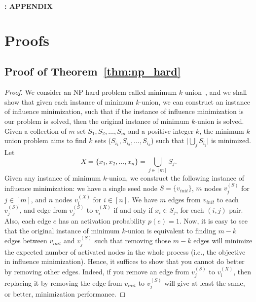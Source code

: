 \newcommand{\smallsection}[1]{\noindent\underline{\smash{\textbf{#1:}}}}

\clearpage
\appendix
\vspace{1mm}
\begin{center}
    \Large{\bf \method: APPENDIX} \\
    \vspace{-1mm}
\end{center}

\section{Proofs}\label{sec:pfs_A}
\subsection{Proof of Theorem~\ref{thm:np_hard}}\label{app:proof:np_hard}
\begin{proof}
    We consider an NP-hard problem called minimum $k$-union~\citep{vinterbo2002note}, and
    we shall show that given each instance of minimum $k$-union, we can construct an instance of influence minimization, such that if the instance of influence minimization is our problem is solved, then the original instance of minimum $k$-union is solved.
    Given a collection of $m$ set $S_1, S_2, \ldots, S_m$ and a positive integer $k$, the minimum $k$-union problem aims to find $k$ sets ($S_{i_1}, S_{i_2}, \ldots, S_{i_k}$) such that $\vert \bigcup_{j} S_{i_j} \vert$ is minimized.
    Let 
    \[X = \{x_1, x_2, \ldots, x_n\} = \bigcup_{j \in [m]}S_j.\]
    Given any instance of minimum $k$-union, we construct the following instance of influence minimization:
    we have a single seed node $S = \{v_{init}\}$,
    $m$ nodes $v^{(S)}_{j}$ for $j \in [m]$, and
    $n$ nodes $v^{(X)}_{i}$ for $i \in [n]$.
    We have $m$ edges from $v_{init}$ to each $v^{(S)}_{j}$, 
    and edge from $v^{(S)}_{j}$ to $v^{(X)}_{i}$ if and only if $x_i \in S_j$, for each $(i, j)$ pair.
    Also, each edge $e$ has an activation probability $p(e) = 1$.
    Now, it is easy to see that the original instance of minimum $k$-union is equivalent to finding $m - k$ edges between $v_{init}$ and $v^{(S)}_{j}$ such that removing those $m - k$ edges will minimize the expected number of activated nodes in the whole process (i.e., the objective in influence minimization).
    Hence, it suffices to show that you cannot do better by removing other edges.
    Indeed, if you remove an edge from $v^{(S)}_{j}$ to $v^{(X)}_{i}$, then replacing it by removing the edge from $v_{init}$ to $v^{(S)}_{j}$ will give at least the same, or better, minimization performance.
\end{proof}

